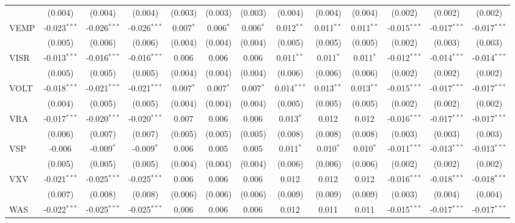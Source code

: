 \begin{table}[!htbp]
\begin{tabular}{@{\extracolsep{5pt}}lcccccccccccc}
  & (0.004) & (0.004) & (0.004) & (0.003) & (0.003) & (0.003) & (0.004) & (0.004) & (0.004) & (0.002) & (0.002) & (0.002) \\
 VEMP & -0.023$^{***}$ & -0.026$^{***}$ & -0.026$^{***}$ & 0.007$^{*}$ & 0.006$^{*}$ & 0.006$^{*}$ & 0.012$^{**}$ & 0.011$^{**}$ & 0.011$^{**}$ & -0.015$^{***}$ & -0.017$^{***}$ & -0.017$^{***}$ \\
  & (0.005) & (0.006) & (0.006) & (0.004) & (0.004) & (0.004) & (0.005) & (0.005) & (0.005) & (0.002) & (0.003) & (0.003) \\
 VISR & -0.013$^{***}$ & -0.016$^{***}$ & -0.016$^{***}$ & 0.006$^{}$ & 0.006$^{}$ & 0.006$^{}$ & 0.011$^{**}$ & 0.011$^{*}$ & 0.011$^{*}$ & -0.012$^{***}$ & -0.014$^{***}$ & -0.014$^{***}$ \\
  & (0.005) & (0.005) & (0.005) & (0.004) & (0.004) & (0.004) & (0.006) & (0.006) & (0.006) & (0.002) & (0.002) & (0.002) \\
 VOLT & -0.018$^{***}$ & -0.021$^{***}$ & -0.021$^{***}$ & 0.007$^{*}$ & 0.007$^{*}$ & 0.007$^{*}$ & 0.014$^{***}$ & 0.013$^{**}$ & 0.013$^{**}$ & -0.015$^{***}$ & -0.017$^{***}$ & -0.017$^{***}$ \\
  & (0.004) & (0.005) & (0.005) & (0.004) & (0.004) & (0.004) & (0.005) & (0.005) & (0.005) & (0.002) & (0.002) & (0.002) \\
 VRA & -0.017$^{***}$ & -0.020$^{***}$ & -0.020$^{***}$ & 0.007$^{}$ & 0.006$^{}$ & 0.006$^{}$ & 0.013$^{*}$ & 0.012$^{}$ & 0.012$^{}$ & -0.016$^{***}$ & -0.017$^{***}$ & -0.017$^{***}$ \\
  & (0.006) & (0.007) & (0.007) & (0.005) & (0.005) & (0.005) & (0.008) & (0.008) & (0.008) & (0.003) & (0.003) & (0.003) \\
 VSP & -0.006$^{}$ & -0.009$^{*}$ & -0.009$^{*}$ & 0.006$^{}$ & 0.005$^{}$ & 0.005$^{}$ & 0.011$^{*}$ & 0.010$^{*}$ & 0.010$^{*}$ & -0.011$^{***}$ & -0.013$^{***}$ & -0.013$^{***}$ \\
  & (0.005) & (0.005) & (0.005) & (0.004) & (0.004) & (0.004) & (0.006) & (0.006) & (0.006) & (0.002) & (0.002) & (0.002) \\
 VXV & -0.021$^{***}$ & -0.025$^{***}$ & -0.025$^{***}$ & 0.006$^{}$ & 0.006$^{}$ & 0.006$^{}$ & 0.012$^{}$ & 0.012$^{}$ & 0.012$^{}$ & -0.016$^{***}$ & -0.018$^{***}$ & -0.018$^{***}$ \\
  & (0.007) & (0.008) & (0.008) & (0.006) & (0.006) & (0.006) & (0.009) & (0.009) & (0.009) & (0.003) & (0.004) & (0.004) \\
 WAS & -0.022$^{***}$ & -0.025$^{***}$ & -0.025$^{***}$ & 0.006$^{}$ & 0.006$^{}$ & 0.006$^{}$ & 0.012$^{}$ & 0.011$^{}$ & 0.011$^{}$ & -0.015$^{***}$ & -0.017$^{***}$ & -0.017$^{***}$ \\

\end{tabular}
\end{table}

